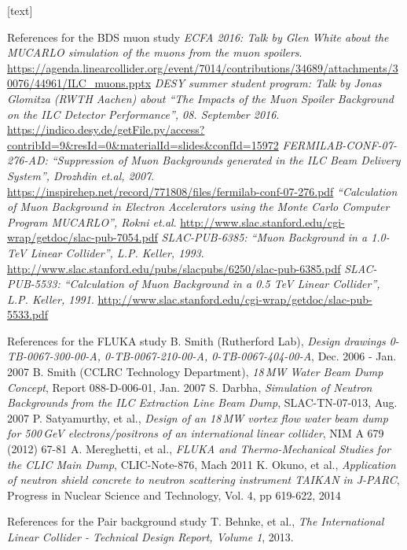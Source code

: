 \documentclass[xcolor={dvipsnames}]{beamer}
\begin{document}
\begin{thebibliography}{9}
[text]
\begin{frame}{References for the BDS muon study}
\tiny
{}  \emph{ECFA 2016: Talk by Glen White about the MUCARLO simulation of the muons from the muon spoilers}. \url{https://agenda.linearcollider.org/event/7014/contributions/34689/attachments/30076/44961/ILC_muons.pptx}
  \emph{DESY summer student program: Talk by Jonas Glomitza (RWTH Aachen) about ``The Impacts of the Muon Spoiler Background on the ILC Detector Performance'', 08. September 2016}. \url{https://indico.desy.de/getFile.py/access?contribId=9&resId=0&materialId=slides&confId=15972}
  \emph{FERMILAB-CONF-07-276-AD: ``Suppression of Muon Backgrounds generated in the ILC Beam Delivery System'', Drozhdin et.al, 2007}. \url{https://inspirehep.net/record/771808/files/fermilab-conf-07-276.pdf}
  \emph{``Calculation of Muon Background in Electron Accelerators using the Monte Carlo Computer Program MUCARLO'', Rokni et.al}. \url{http://www.slac.stanford.edu/cgi-wrap/getdoc/slac-pub-7054.pdf}
  \emph{SLAC-PUB-6385: ``Muon Background in a 1.0-TeV Linear Collider'', L.P. Keller, 1993}. \url{http://www.slac.stanford.edu/pubs/slacpubs/6250/slac-pub-6385.pdf}
  \emph{SLAC-PUB-5533: ``Calculation of Muon Background in a 0.5 TeV Linear Collider'', L.P. Keller, 1991}. \url{http://www.slac.stanford.edu/cgi-wrap/getdoc/slac-pub-5533.pdf}
\end{frame}
\begin{frame}{References for the FLUKA study}
\tiny
{} B. Smith (Rutherford Lab), \emph{Design drawings 0-TB-0067-300-00-A, 0-TB-0067-210-00-A, 0-TB-0067-404-00-A}, Dec. 2006 - Jan. 2007
 B. Smith (CCLRC Technology Department), \emph{18\,MW Water Beam Dump Concept}, Report 088-D-006-01, Jan. 2007
 S. Darbha, \emph{Simulation of Neutron Backgrounds from the ILC Extraction Line Beam Dump}, SLAC-TN-07-013, Aug. 2007
 P. Satyamurthy, et al., \emph{Design of an 18\,MW vortex flow water beam dump for 500\,GeV electrons/positrons of an international linear collider}, NIM A 679 (2012) 67-81
 A. Mereghetti, et al., \emph{FLUKA and Thermo-Mechanical Studies for the CLIC Main Dump}, CLIC-Note-876, Mach 2011
 K. Okuno, et al., \emph{Application of neutron shield concrete to neutron scattering instrument TAIKAN in J-PARC}, Progress in Nuclear Science and Technology, Vol. 4, pp 619-622, 2014
\end{frame}
\begin{frame}{References for the Pair background study}
\tiny
{} T. Behnke, et al., \emph{The International Linear Collider - Technical Design Report, Volume 1}, 2013.
\end{frame}
\end{thebibliography}
\end{document}

